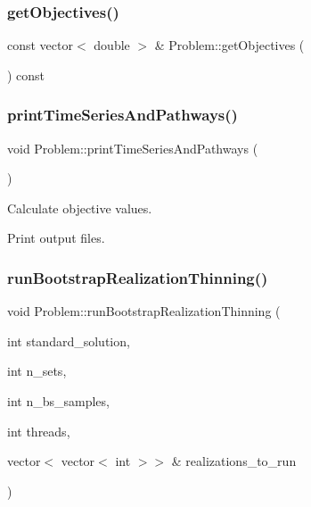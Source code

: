 \mbox{\label{classProblem_a55da26d3bd669809b992fff823b8ef9b}} 
\subsubsection{\texorpdfstring{get\+Objectives()}{getObjectives()}}
{\footnotesize\ttfamily const vector$<$ double $>$ \& Problem\+::get\+Objectives (\begin{DoxyParamCaption}{ }\end{DoxyParamCaption}) const}

\mbox{\label{classProblem_a77568843acf22f2ecd17a83a1f3f310a}} 
\subsubsection{\texorpdfstring{print\+Time\+Series\+And\+Pathways()}{printTimeSeriesAndPathways()}}
{\footnotesize\ttfamily void Problem\+::print\+Time\+Series\+And\+Pathways (\begin{DoxyParamCaption}{ }\end{DoxyParamCaption})}

Calculate objective values.

Print output files. \mbox{\label{classProblem_a3604aafc0cf731fc9dfa8589ec8995ce}} 
\subsubsection{\texorpdfstring{run\+Bootstrap\+Realization\+Thinning()}{runBootstrapRealizationThinning()}}
{\footnotesize\ttfamily void Problem\+::run\+Bootstrap\+Realization\+Thinning (\begin{DoxyParamCaption}\item[{int}]{standard\+\_\+solution,  }\item[{int}]{n\+\_\+sets,  }\item[{int}]{n\+\_\+bs\+\_\+samples,  }\item[{int}]{threads,  }\item[{vector$<$ vector$<$ int $>$$>$ \&}]{realizations\+\_\+to\+\_\+run }\end{DoxyParamCaption})}


